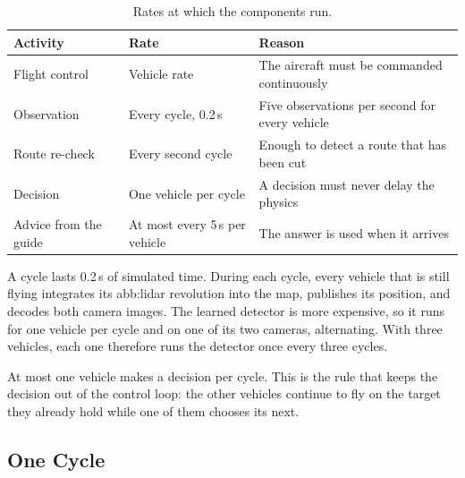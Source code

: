 \begin{table}[!htb]
    \centering
    \caption{Rates at which the components run.}%
    \label{tab:sys:rates}
    \setlength{\tabcolsep}{4pt}
    \begin{tabular}{@{}>{\raggedright\arraybackslash}p{3.6cm}
            >{\raggedright\arraybackslash}p{4.2cm}
            >{\raggedright\arraybackslash}p{7.0cm}@{}}
        \toprule
        \textbf{Activity}     & \textbf{Rate}                  & \textbf{Reason}                                  \\
        \midrule
        Flight control        & Vehicle rate                   & The aircraft must be commanded continuously      \\
        \addlinespace
        Observation           & Every cycle, 0.2\,s            & Five observations per second for every vehicle   \\
        \addlinespace
        Route re-check        & Every second cycle             & Enough to detect a route that has been cut       \\
        \addlinespace
        Decision              & One vehicle per cycle          & A decision must never delay the physics          \\
        \addlinespace
        Advice from the guide & At most every 5\,s per vehicle & The answer is used when it arrives               \\
        \bottomrule
    \end{tabular}
\end{table}

\FloatBarrier

A cycle lasts 0.2\,s of simulated time. During each cycle, every vehicle that is
still flying integrates its \gls{abb:lidar} revolution into the map, publishes
its position, and decodes both camera images. The learned detector is more
expensive, so it runs for one vehicle per cycle and on one of its two cameras,
alternating. With three vehicles, each one therefore runs the detector once every
three cycles.

At most one vehicle makes a decision per cycle. This is the rule that keeps the
decision out of the control loop: the other vehicles continue to fly on the
target they already hold while one of them chooses its next.

\subsection{One Cycle}%
\label{subsec:sys:cycle}

